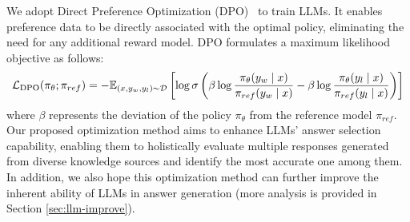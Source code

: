 We adopt Direct Preference Optimization (DPO)~\cite{Rafailov2023DPO} to train LLMs.
It enables preference data to be directly associated with the optimal policy, eliminating the need for any additional reward model.
DPO formulates a maximum likelihood objective as follows:
\begin{equation}\label{eq:optimum_model}
    \tiny
    \mathcal{L}_\text{DPO}(\pi_{\theta}; \pi_{ref}) = -\mathbb{E}_{(x, y_w, y_l)\sim \mathcal{D}}\left[\log \sigma \left(\beta \log \frac{\pi_{\theta}(y_w\mid x)}{\pi_{ref}(y_w\mid x)} - \beta \log \frac{\pi_{\theta}(y_l\mid x)}{\pi_{ref}(y_l\mid x)}\right)\right]
\end{equation}
where  $\beta$ represents the deviation of the policy $\pi_{\theta}$ from the reference model $\pi_{ref}$.
Our proposed optimization method aims to enhance LLMs' answer selection capability, enabling them to holistically evaluate multiple responses generated from diverse knowledge sources and identify the most accurate one among them.
In addition, we also hope this optimization method can further improve the inherent ability of LLMs in answer generation (more analysis is provided in Section \ref{sec:llm-improve}).





